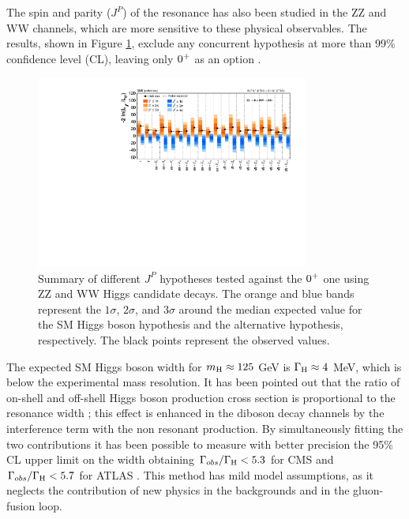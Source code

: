 The spin and parity ($J^P$) of the resonance has also been studied in the ZZ and WW channels, which are more sensitive to these physical observables. The results, shown in Figure \ref{fig:hjp}, exclude any concurrent hypothesis at more than 99\% confidence level (CL), leaving only $0^{+}$ as an option \cite{CMS:2014gga}.

\begin{figure}
        \centering
	\includegraphics[width=0.8\textwidth]{1_Introduction_Th_and_Exp/pics/hwwhzz_JP_SummaryPlot.pdf}
       \caption{Summary of different $J^P$ hypotheses tested against the $0^{+}$ one using ZZ and WW Higgs candidate decays. The orange and blue bands represent the $1\sigma$, $2\sigma$, and $3\sigma$ around the median expected value for the SM Higgs boson hypothesis and the alternative hypothesis, respectively. The black points represent the observed values. }
       \label{fig:hjp}
\end{figure}

The expected SM Higgs boson width for $m_{\mathrm{H}} \approx 125$ GeV is $\Gamma_{\mathrm{H}} \approx 4$ MeV, which is below the experimental mass resolution. It has been pointed out that the ratio of on-shell and off-shell Higgs boson production cross section is proportional to the resonance width \cite{Caola:2013yja}; this effect is enhanced in the diboson decay channels by the interference term with the non resonant production. By simultaneously fitting the two contributions it has been possible to measure with better precision the 95\% CL upper limit on the width obtaining $\Gamma_{obs} / \Gamma_{\mathrm{H}} < 5.3$ for CMS \cite{Khachatryan:2014iha} and $\Gamma_{obs} / \Gamma_{\mathrm{H}} < 5.7$ for ATLAS \cite{ATLASCONF:2014042}. This method has mild model assumptions, as it neglects the contribution of new physics in the backgrounds and in the gluon-fusion loop. 

